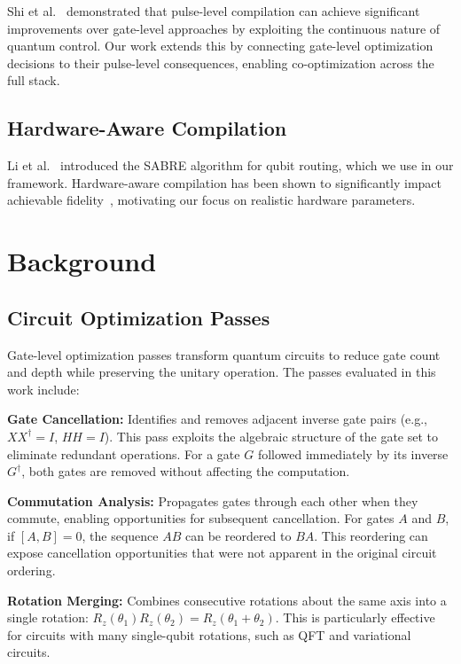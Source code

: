 \documentclass[journal]{IEEEtran}
\begin{document}
Shi et al.~\cite{shi2019optimized} demonstrated that pulse-level compilation can achieve significant improvements over gate-level approaches by exploiting the continuous nature of quantum control. Our work extends this by connecting gate-level optimization decisions to their pulse-level consequences, enabling co-optimization across the full stack.

\subsection{Hardware-Aware Compilation}

Li et al.~\cite{li2019tackling} introduced the SABRE algorithm for qubit routing, which we use in our framework. Hardware-aware compilation has been shown to significantly impact achievable fidelity~\cite{cowtan2019qubit}, motivating our focus on realistic hardware parameters.

\section{Background}
\label{sec:background}

\subsection{Circuit Optimization Passes}

Gate-level optimization passes transform quantum circuits to reduce gate count and depth while preserving the unitary operation. The passes evaluated in this work include:

\textbf{Gate Cancellation:} Identifies and removes adjacent inverse gate pairs (e.g., $XX^{\dagger} = I$, $HH = I$). This pass exploits the algebraic structure of the gate set to eliminate redundant operations. For a gate $G$ followed immediately by its inverse $G^{\dagger}$, both gates are removed without affecting the computation.

\textbf{Commutation Analysis:} Propagates gates through each other when they commute, enabling opportunities for subsequent cancellation. For gates $A$ and $B$, if $[A, B] = 0$, the sequence $AB$ can be reordered to $BA$. This reordering can expose cancellation opportunities that were not apparent in the original circuit ordering.

\textbf{Rotation Merging:} Combines consecutive rotations about the same axis into a single rotation: $R_z(\theta_1)R_z(\theta_2) = R_z(\theta_1 + \theta_2)$. This is particularly effective for circuits with many single-qubit rotations, such as QFT and variational circuits.
\end{document}
